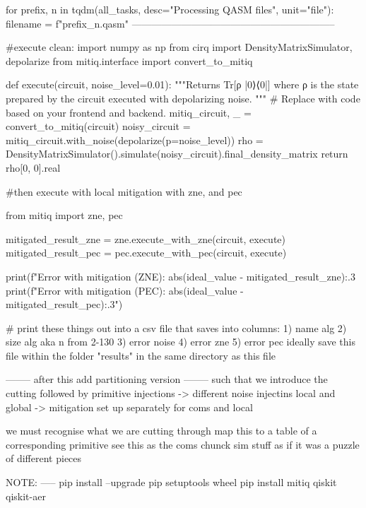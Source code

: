     for prefix, n in tqdm(all_tasks, desc="Processing QASM files", unit="file"):
        filename = f"{prefix}_{n}.qasm"
--------------------------------------------------------------

#execute clean: 
import numpy as np
from cirq import DensityMatrixSimulator, depolarize
from mitiq.interface import convert_to_mitiq

def execute(circuit, noise_level=0.01):
    """Returns Tr[ρ |0⟩⟨0|] where ρ is the state prepared by the circuit
    executed with depolarizing noise.
    """
    # Replace with code based on your frontend and backend.
    mitiq_circuit, _ = convert_to_mitiq(circuit)
    noisy_circuit = mitiq_circuit.with_noise(depolarize(p=noise_level))
    rho = DensityMatrixSimulator().simulate(noisy_circuit).final_density_matrix
    return rho[0, 0].real

#then execute with local mitigation with zne, and pec

from mitiq import zne, pec

mitigated_result_zne = zne.execute_with_zne(circuit, execute)
mitigated_result_pec = pec.execute_with_pec(circuit, execute)

print(f"Error with mitigation (ZNE): {abs(ideal_value - mitigated_result_zne):.{3}}
print(f"Error with mitigation (PEC): {abs(ideal_value - mitigated_result_pec):.{3}}")

# print these things out into a csv file that saves into columns:
1) name alg 2) size alg aka n from 2-130 3) error noise 4) error zne 5) error pec 
ideally save this file within the folder "results" in the same directory as this file



-------- after this add partitioning version --------
such that we introduce the cutting
followed by primitive injections
-> different noise injectins local and global
-> mitigation set up separately for coms and local 

we must recognise what we are cutting through
map this to a table of a corresponding primitive
see this as the coms chunck
sim stuff as if it was a puzzle of different pieces


NOTE:
-----
pip install --upgrade pip setuptools wheel
pip install mitiq qiskit qiskit-aer
